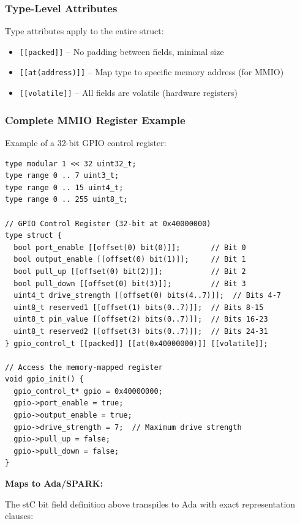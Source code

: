 \documentclass[11pt,letterpaper,twoside,openany]{book}
\begin{document}
\subsubsection{Type-Level Attributes}

Type attributes apply to the entire struct:

\begin{itemize}
\item \verb'[[packed]]' -- No padding between fields, minimal size
\item \verb'[[at(address)]]' -- Map type to specific memory address (for MMIO)
\item \verb'[[volatile]]' -- All fields are volatile (hardware registers)
\end{itemize}

\subsubsection{Complete MMIO Register Example}

Example of a 32-bit GPIO control register:

\begin{lstlisting}
type modular 1 << 32 uint32_t;
type range 0 .. 7 uint3_t;
type range 0 .. 15 uint4_t;
type range 0 .. 255 uint8_t;

// GPIO Control Register (32-bit at 0x40000000)
type struct {
  bool port_enable [[offset(0) bit(0)]];       // Bit 0
  bool output_enable [[offset(0) bit(1)]];     // Bit 1
  bool pull_up [[offset(0) bit(2)]];           // Bit 2
  bool pull_down [[offset(0) bit(3)]];         // Bit 3
  uint4_t drive_strength [[offset(0) bits(4..7)]];  // Bits 4-7
  uint8_t reserved1 [[offset(1) bits(0..7)]];  // Bits 8-15
  uint8_t pin_value [[offset(2) bits(0..7)]];  // Bits 16-23
  uint8_t reserved2 [[offset(3) bits(0..7)]];  // Bits 24-31
} gpio_control_t [[packed]] [[at(0x40000000)]] [[volatile]];

// Access the memory-mapped register
void gpio_init() {
  gpio_control_t* gpio = 0x40000000;
  gpio->port_enable = true;
  gpio->output_enable = true;
  gpio->drive_strength = 7;  // Maximum drive strength
  gpio->pull_up = false;
  gpio->pull_down = false;
}
\end{lstlisting}

\textbf{Maps to Ada/SPARK:}

The stC bit field definition above transpiles to Ada with exact representation clauses:
\end{document}

